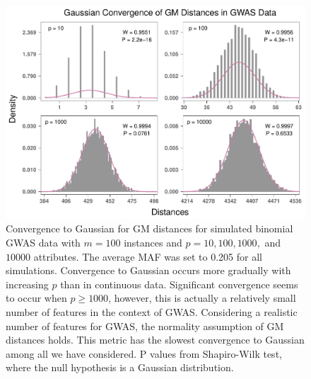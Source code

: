 \documentclass[10pt,letterpaper]{article}\usepackage[]{graphicx}\usepackage[]{color}
\begin{document}
\begin{figure}[H]
	\includegraphics[width=\textwidth]{central_limit_hist_gwas_GM.pdf}
	\caption{Convergence to Gaussian for GM distances for simulated binomial GWAS data with $m=100$ instances and $p=10, 100, 1000,$ and $10000$ attributes. The average MAF was set to 0.205 for all simulations. Convergence to Gaussian occurs more gradually with increasing $p$ than in continuous data. Significant convergence seems to occur when $p \geq 1000$, however, this is actually a relatively small number of features in the context of GWAS. Considering a realistic number of features for GWAS, the normality assumption of GM distances holds. This metric has the slowest convergence to Gaussian among all we have considered. P values from Shapiro-Wilk test, where the null hypothesis is a Gaussian distribution.}
\end{figure}
\end{document}
